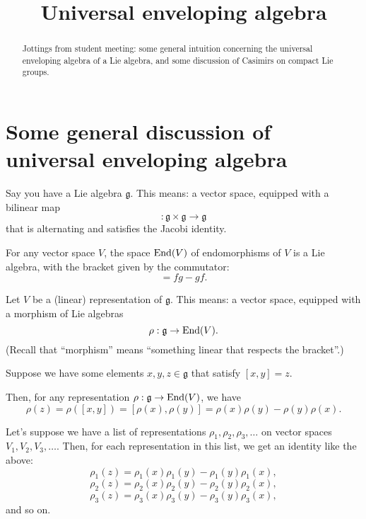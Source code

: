 \documentclass[reqno]{amsart} 
\title{Universal enveloping algebra}
\begin{document}
\begin{abstract}
  Jottings from student meeting: some general intuition concerning the universal enveloping algebra of a Lie algebra, and some discussion of Casimirs on compact Lie groups.
\end{abstract}

\maketitle

\section{Some general discussion of universal enveloping algebra}\label{sec:cngsxurern}
Say you have a Lie algebra $\mathfrak{g}$.  This means: a vector space, equipped with a bilinear map
\begin{equation*}
  [\cdot, \cdot] : \mathfrak{g} \times \mathfrak{g} \rightarrow \mathfrak{g}
\end{equation*}
that is alternating and satisfies the Jacobi identity.

\begin{example}\label{example:cngsxuq83x}
  For any vector space $V$, the space $\operatorname{End}(V)$ of endomorphisms of $V$ is a Lie algebra, with the bracket given by the commutator:
  \begin{equation*}
    [f, g] = f g - g f.
  \end{equation*}
\end{example}

Let $V$ be a (linear) representation of $\mathfrak{g}$.  This means: a vector space, equipped with a morphism of Lie algebras
\begin{equation*}
  \rho : \mathfrak{g} \rightarrow \operatorname{End}(V).
\end{equation*}
(Recall that ``morphism'' means ``something linear that respects the bracket''.)

Suppose we have some elements $x, y, z \in \mathfrak{g}$ that satisfy $[x,y] = z$.

Then, for any representation $\rho : \mathfrak{g} \rightarrow \operatorname{End}(V)$, we have
\begin{equation*}
  \rho(z) = \rho([x,y]) = [\rho(x), \rho(y)] = \rho(x) \rho(y) - \rho(y) \rho(x).
\end{equation*}

Let's suppose we have a list of representations $\rho_1, \rho_2, \rho_3, \dotsc$ on vector spaces $V_1, V_2, V_3, \dotsc$.  Then, for each representation in this list, we get an identity like the above:
\begin{equation*}
  \rho_1(z) = \rho_1(x) \rho_1(y) - \rho_1(y) \rho_1(x),
\end{equation*}
\begin{equation*}
  \rho_2(z) = \rho_2(x) \rho_2(y) - \rho_2(y) \rho_2(x),
\end{equation*}
\begin{equation*}
  \rho_3(z) = \rho_3(x) \rho_3(y) - \rho_3(y) \rho_3(x),
\end{equation*}
and so on.
\end{document}
